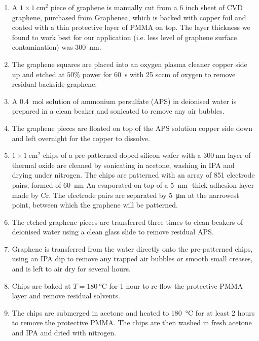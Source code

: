 \begin{enumerate}
    \item A $1\times\SI{1}{\centi\metre\squared}$ piece of graphene is manually cut from a 6 inch sheet of \gls{CVD} graphene, purchased from Graphenea, which is backed with copper foil and coated with a thin protective layer of PMMA on top. The layer thickness we found to work best for our application (i.e. less level of graphene surface contamination) was \SI{300}{\nano\metre}.
    \item The graphene squares are placed into an oxygen plasma cleaner copper side up and etched at $50 \%$ power for \SI{60}{\second} with 25 sccm of oxygen to remove residual backside graphene.
    \item A \SI{0.4}{\mole} solution of ammonium persulfate (APS) in deionised water is prepared in a clean beaker and sonicated to remove any air bubbles.
    \item The graphene pieces are floated on top of the APS solution copper side down and left overnight for the copper to dissolve.
    \item $1\times\SI{1}{\centi\metre\squared}$ chips of a pre-patterned doped silicon wafer with a $300 \mathrm{~nm}$ layer of thermal oxide are cleaned by sonicating in acetone, washing in IPA and drying under nitrogen. The chips are patterned with an array of 851 electrode pairs, formed of \SI{60}{\nano\metre} Au evaporated on top of a \SI{5}{\nano\metre} -thick adhesion layer made by Cr. The electrode pairs are separated by \SI{5}{\micro\metre} at the narrowest point, between which the graphene will be patterned.
    \item The etched graphene pieces are transferred three times to clean beakers of deionised water using a clean glass slide to remove residual APS.
    \item Graphene is transferred from the water directly onto the pre-patterned chips, using an IPA dip to remove any trapped air bubbles or smooth small creases, and is left to air dry for several hours.
    \item Chips are baked at $T=\SI{180}{\degreeCelsius}$ for 1 hour to re-flow the protective PMMA layer and remove residual solvents.
    \item The chips are submerged in acetone and heated to \SI{180}{\degreeCelsius} for at least 2 hours to remove the protective PMMA. The chips are then washed in fresh acetone and IPA and dried with nitrogen.
\end{enumerate}
%
